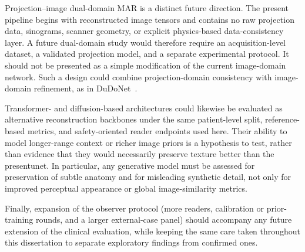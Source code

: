 Projection--image dual-domain MAR is a distinct future direction. The present pipeline begins with reconstructed image tensors and contains no raw projection data, sinograms, scanner geometry, or explicit physics-based data-consistency layer. A future dual-domain study would therefore require an acquisition-level dataset, a validated projection model, and a separate experimental protocol. It should not be presented as a simple modification of the current image-domain network. Such a design could combine projection-domain consistency with image-domain refinement, as in DuDoNet~\cite{linDuDoNetDualDomain2019}.

Transformer- and diffusion-based architectures could likewise be evaluated as alternative reconstruction backbones under the same patient-level split, reference-based metrics, and safety-oriented reader endpoints used here. Their ability to model longer-range context or richer image priors is a hypothesis to test, rather than evidence that they would necessarily preserve texture better than the present\acrshort{unet}. In particular, any generative model must be assessed for preservation of subtle anatomy and for misleading synthetic detail, not only for improved perceptual appearance or global image-similarity metrics.

Finally, expansion of the observer protocol (more readers, calibration or prior-training rounds, and a larger external-case panel) should accompany any future extension of the clinical evaluation, while keeping the same care taken throughout this dissertation to separate exploratory findings from confirmed ones.

